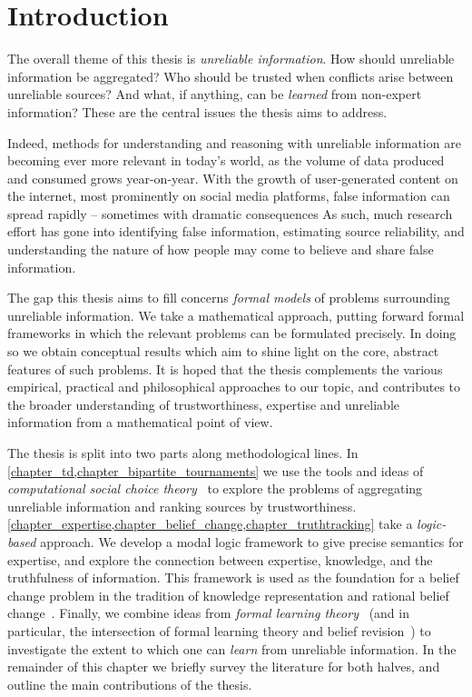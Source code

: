 \chapter{Introduction}

The overall theme of this thesis is \emph{unreliable information}. How should
unreliable information be aggregated? Who should be trusted when conflicts
arise between unreliable sources? And what, if anything, can be \emph{learned}
from non-expert information? These are the central issues the thesis aims to
address.

Indeed, methods for understanding and reasoning with unreliable information are
becoming ever more relevant in today's world, as the volume of data produced
and consumed grows year-on-year. With the growth of user-generated
content on the internet, most prominently on social media platforms, false
information can spread rapidly -- sometimes with dramatic
consequences As such, much research effort has gone into identifying
false information, estimating source reliability, and understanding the nature
of how people may come to believe and share false information.

The gap this thesis aims to fill concerns \emph{formal models} of problems
surrounding unreliable information. We take a mathematical approach, putting
forward formal frameworks in which the relevant problems can be formulated
precisely. In doing so we obtain conceptual results which aim to shine light on
the core, abstract features of such problems. It is hoped that the thesis
complements the various empirical, practical and philosophical approaches
to our topic, and contributes to the broader understanding of
trustworthiness, expertise and unreliable information from a mathematical point
of view.

The thesis is split into two parts along methodological lines. In
\cref{chapter_td,chapter_bipartite_tournaments} we use the tools and ideas of
\emph{computational social choice theory}~\cite{brandt2016introduction} to
explore the problems of aggregating unreliable information and ranking sources
by trustworthiness.
%
\cref{chapter_expertise,chapter_belief_change,chapter_truthtracking} take a
\emph{logic-based} approach. We develop a modal logic framework to give precise
semantics for expertise, and explore the connection between expertise,
knowledge, and the truthfulness of information. This framework is used as the
foundation for a belief change problem in the tradition of knowledge
representation and rational belief
change~\cite{booth_belief_2011,sep_belief_change,ferme_2018}. Finally, we
combine ideas from \emph{formal learning
theory}~\cites{jain1999systems}[]{gierasimczuk2010knowing}
(and in particular, the intersection of formal learning theory and belief
revision~\cite{baltag_tt_2019}) to investigate the extent to which one can
\emph{learn} from unreliable information.
%
In the remainder of this chapter we briefly survey the literature for both
halves, and outline the main contributions of the thesis.


